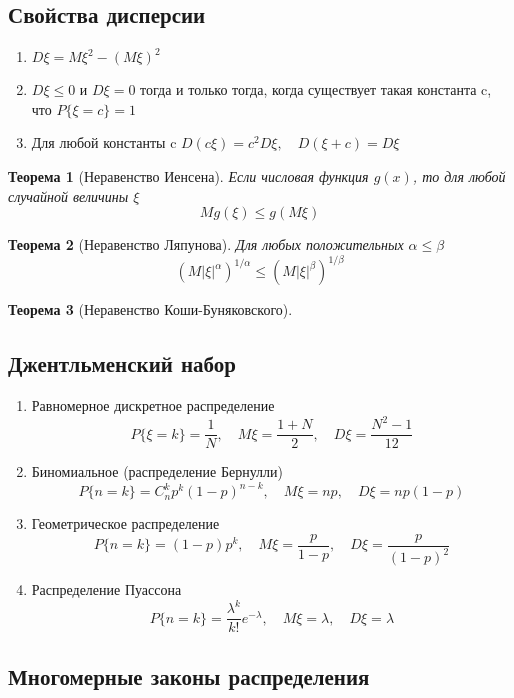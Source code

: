 \documentclass[a4paper]{article}
\newtheorem{theorem}{Теорема}[section]
\theoremstyle{definition}
\theoremstyle{remark}
\begin{document}
\subsection{Свойства дисперсии}
\begin{enumerate}
    \item $D\xi = M\xi^2 - (M\xi)^2$
    \item $D\xi\leq 0$ и $D\xi = 0$ тогда и только тогда, когда существует такая константа c, что $P\{\xi = c\} = 1$
    \item Для любой константы c $D(c\xi) = c^2 D\xi, \quad D(\xi +c) = D\xi$
\end{enumerate}
\begin{theorem}[Неравенство Иенсена]
    Если числовая функция $g(x)$, то для любой случайной величины $\xi$
    \[Mg(\xi)\leq g(M\xi)\]
\end{theorem}
\begin{theorem}[Неравенство Ляпунова]
    Для любых положительных $\alpha \leq \beta$
    \[(M|\xi|^\alpha)^{1/ \alpha}\leq (M|\xi|^\beta)^{1/ \beta}\]
\end{theorem}
\begin{theorem}[Неравенство Коши-Буняковского]
    
\end{theorem}
\subsection{Джентльменский набор}
\begin{enumerate}
    \item Равномерное дискретное распределение
    \[P\{\xi=k\} = \frac{1}{N}, \quad M\xi = \frac{1+N}{2}, \quad D\xi = \frac{N^2-1}{12}\]
    \item Биномиальное (распределение Бернулли)
    \[P\{n=k\}=C_n^k p^k (1-p)^{n-k}, \quad M\xi = np, \quad D\xi = np(1-p)\]
    \item Геометрическое распределение
    \[P\{n=k\}=(1-p)p^k, \quad M\xi = \frac{p}{1-p}, \quad D\xi = \frac{p}{(1-p)^2}\]
    \item Распределение Пуассона
    \[P\{n=k\}=\frac{\lambda^k}{k!}e^{-\lambda}, \quad M\xi = \lambda, \quad D\xi = \lambda\]
    
\end{enumerate} 
\subsection{Многомерные законы распределения}
\end{document}

